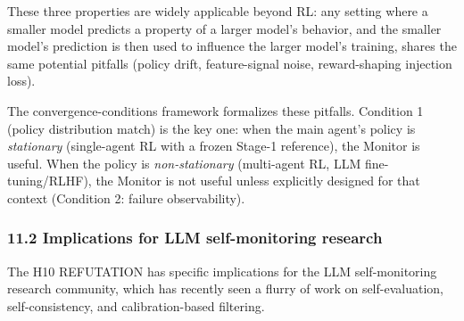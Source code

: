 \documentclass[11pt]{article}
\begin{document}
These three properties are widely applicable beyond RL: any setting
where a smaller model predicts a property of a larger model's behavior,
and the smaller model's prediction is then used to influence the larger
model's training, shares the same potential pitfalls (policy drift,
feature-signal noise, reward-shaping injection loss).

The convergence-conditions framework formalizes these pitfalls.
Condition 1 (policy distribution match) is the key one: when the main
agent's policy is \emph{stationary} (single-agent RL with a frozen
Stage-1 reference), the Monitor is useful. When the policy is
\emph{non-stationary} (multi-agent RL, LLM fine-tuning/RLHF), the
Monitor is not useful unless explicitly designed for that context
(Condition 2: failure observability).

\subsubsection{11.2 Implications for LLM self-monitoring
research}\label{implications-for-llm-self-monitoring-research}

The H10 REFUTATION has specific implications for the LLM self-monitoring
research community, which has recently seen a flurry of work on
self-evaluation, self-consistency, and calibration-based filtering.
\end{document}
